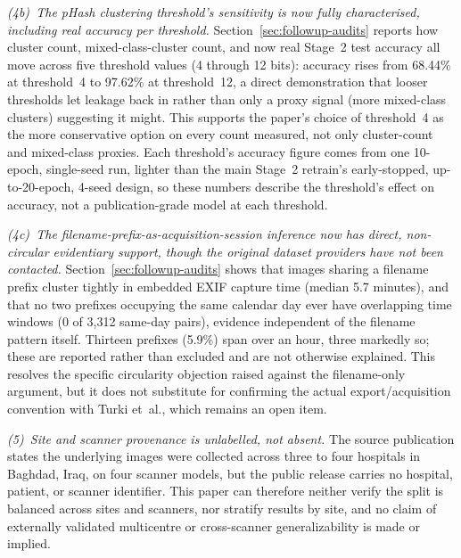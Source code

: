 \textit{(4b)~The pHash clustering threshold's sensitivity is now fully characterised, including real accuracy per threshold.} Section~\ref{sec:followup-audits} reports how cluster count, mixed-class-cluster count, and now real Stage~2 test accuracy all move across five threshold values (4 through 12 bits): accuracy rises from 68.44\% at threshold~4 to 97.62\% at threshold~12, a direct demonstration that looser thresholds let leakage back in rather than only a proxy signal (more mixed-class clusters) suggesting it might. This supports the paper's choice of threshold~4 as the more conservative option on every count measured, not only cluster-count and mixed-class proxies. Each threshold's accuracy figure comes from one 10-epoch, single-seed run, lighter than the main Stage~2 retrain's early-stopped, up-to-20-epoch, 4-seed design, so these numbers describe the threshold's effect on accuracy, not a publication-grade model at each threshold.

\textit{(4c)~The filename-prefix-as-acquisition-session inference now has direct, non-circular evidentiary support, though the original dataset providers have not been contacted.} Section~\ref{sec:followup-audits} shows that images sharing a filename prefix cluster tightly in embedded EXIF capture time (median 5.7 minutes), and that no two prefixes occupying the same calendar day ever have overlapping time windows (0 of 3,312 same-day pairs), evidence independent of the filename pattern itself. Thirteen prefixes (5.9\%) span over an hour, three markedly so; these are reported rather than excluded and are not otherwise explained. This resolves the specific circularity objection raised against the filename-only argument, but it does not substitute for confirming the actual export/acquisition convention with Turki et~al., which remains an open item.

\textit{(5)~Site and scanner provenance is unlabelled, not absent.} The source publication states the underlying images were collected across three to four hospitals in Baghdad, Iraq, on four scanner models, but the public release carries no hospital, patient, or scanner identifier. This paper can therefore neither verify the split is balanced across sites and scanners, nor stratify results by site, and no claim of externally validated multicentre or cross-scanner generalizability is made or implied.

